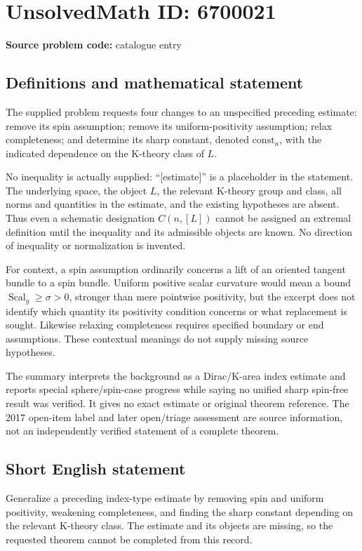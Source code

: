 \documentclass[11pt]{article}
\begin{document}
\section*{UnsolvedMath ID: 6700021}
\textbf{Source problem code:} catalogue entry
\subsection{Definitions and mathematical statement}
The supplied problem requests four changes to an unspecified preceding estimate: remove its spin assumption; remove its uniform-positivity assumption; relax completeness; and determine its sharp constant, denoted \(\mathrm{const}_n\), with the indicated dependence on the K-theory class of \(L\).

No inequality is actually supplied: ``[estimate]'' is a placeholder in the statement. The underlying space, the object \(L\), the relevant K-theory group and class, all norms and quantities in the estimate, and the existing hypotheses are absent. Thus even a schematic designation \(C(n,[L])\) cannot be assigned an extremal definition until the inequality and its admissible objects are known. No direction of inequality or normalization is invented.

For context, a spin assumption ordinarily concerns a lift of an oriented tangent bundle to a spin bundle. Uniform positive scalar curvature would mean a bound \(\operatorname{Scal}_g\ge\sigma>0\), stronger than mere pointwise positivity, but the excerpt does not identify which quantity its positivity condition concerns or what replacement is sought. Likewise relaxing completeness requires specified boundary or end assumptions. These contextual meanings do not supply missing source hypotheses.

The summary interprets the background as a Dirac/K-area index estimate and reports special sphere/spin-case progress while saying no unified sharp spin-free result was verified. It gives no exact estimate or original theorem reference. The 2017 open-item label and later open/triage assessment are source information, not an independently verified statement of a complete theorem.
\subsection{Short English statement}
Generalize a preceding index-type estimate by removing spin and uniform positivity, weakening completeness, and finding the sharp constant depending on the relevant K-theory class. The estimate and its objects are missing, so the requested theorem cannot be completed from this record.
\end{document}
